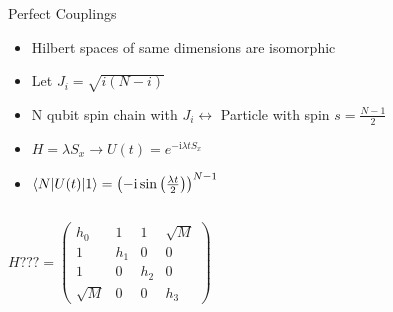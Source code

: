 \documentclass{beamer}
\begin{document}
\begin{frame}[t]{Perfect Couplings}
	\centering
	\begin{itemize}
		\item Hilbert spaces of same dimensions are isomorphic
		\item Let $J_i = \sqrt{i(N-i)}$
		\item N qubit spin chain with $J_i \leftrightarrow$ Particle with spin $s = \frac{N-1}{2}$
		\item $H=\lambda S_x \rightarrow U(t)=e^{-\text{i}\lambda t S_x}$
		\item $\braket{N|U(t)|1} = \left( -\text{i}\sin\left(\frac{\lambda t}{2}\right) \right)^{N-1}$
	\end{itemize}	
	\begin{columns}[T]
		\begin{column}{0.5\textwidth}
			\centering
   			$H??? = \begin{pmatrix}
			h_0 & 1 & 1 & \sqrt{M} \\
			1 & h_1 & 0 & 0 \\
			1 & 0 & h_2 & 0 \\
			\sqrt{M} & 0 & 0 & h_3
\end{pmatrix}$
		\end{column}
		\begin{column}{0.5\textwidth}
			\centering
		\end{column}
	\end{columns}
\end{frame}
\end{document}

